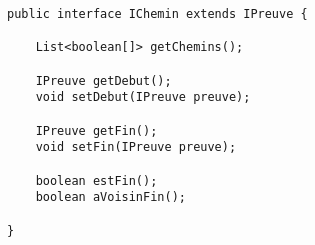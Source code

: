 \documentclass[dvipsnames]{report}
\begin{document}
\newpage
\begin{lstlisting}[caption={Interface \psverb+IChemin+}, label={lst:IChemin}]
public interface IChemin extends IPreuve {

	List<boolean[]> getChemins();

	IPreuve getDebut();
	void setDebut(IPreuve preuve);

	IPreuve getFin();
	void setFin(IPreuve preuve);

	boolean estFin();
	boolean aVoisinFin();

}
\end{lstlisting}
\end{document}
